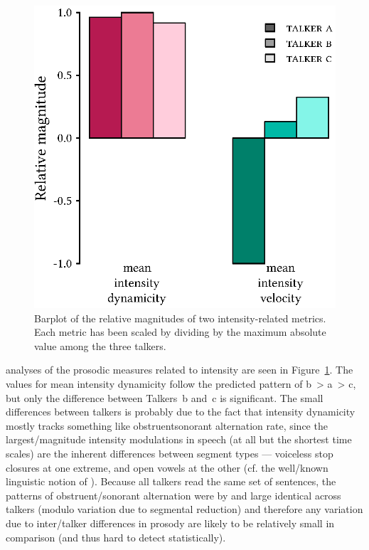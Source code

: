 \begin{figure}[bt]
	\begin{centering}
	\includegraphics{figures/posthocs/ProsodicMeasuresIntensityOnly.eps}
	\caption[Barplot of intensity metrics]{Barplot of the relative magnitudes of two intensity-related metrics.  Each metric has been scaled by dividing by the maximum absolute value among the three talkers.\label{fig:ProsodicMeasuresIntensity}}
	\end{centering}
\end{figure}

\Ph{} analyses of the prosodic measures related to intensity are seen in Figure~\ref{fig:ProsodicMeasuresIntensity}.  The values for mean intensity dynamicity follow the predicted pattern of \ac{b}~> \ac{a}~> \ac{c}, but only the difference between Talkers~\ac{b} and~\ac{c} is significant.  The small differences between talkers is probably due to the fact that intensity dynamicity mostly tracks something like obstruent\slsh sonorant alternation rate, since the largest\-/magnitude intensity modulations in speech (at all but the shortest time scales) are the inherent differences between segment types — voiceless stop closures at one extreme, and open vowels at the other (cf. the well\-/known linguistic notion of ).  Because all talkers read the same set of sentences, the patterns of obstruent\-/sonorant alternation were by and large identical across talkers (modulo variation due to segmental reduction) and therefore any variation due to inter\-/talker differences in prosody are likely to be relatively small in comparison (and thus hard to detect statistically).

